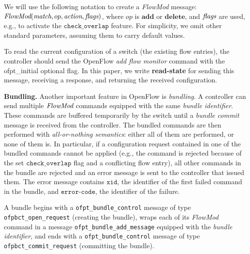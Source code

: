 \documentclass{sig-alternate-2006}
\newcommand{\add}{\textbf{add}\xspace}
\newcommand{\dele}{\textbf{delete}\xspace}
\newcommand{\FlowMod}{\emph{FlowMod}\xspace}
\newcommand{\match}{\emph{match}\xspace}
\newcommand{\action}{\emph{action}\xspace}
\newcommand{\flags}{\emph{flags}\xspace}
\newcommand{\checko}{\texttt{check\_overlap}\xspace}
\newcommand{\stefan}[1]{\textit{\textcolor{red}{[stefan]: #1}}} %
\newcommand{\liron}[1]{\textit{\textcolor{mypurple}{[liron]: #1}}} %
\newcommand{\petr}[1]{\textit{\textcolor{blue}{[petr]: #1}}} %
\newcommand{\xid}{\texttt{xid}}
\newcommand{\ecode}{\texttt{error-code}}
\begin{document}
We will use the following notation to create a \emph{FlowMod} message:
$\FlowMod(\match, op, \action, \flags)$, where
$op$ is $\add$ or $\dele$, and $\flags$ are used, e.g.,  to activate the $\checko$
feature.
For simplicity, we omit other standard parameters, assuming them to carry
default values.

To read the current configuration of a switch (the existing flow entries), the controller should send
the OpenFlow \emph{add flow monitor} command with the \textsf{ofpt\_initial} optional flag.
In this paper, we write \textbf{read-state} for sending
this message, receiving a response, and returning the received configuration.

\vspace{1mm}
\noindent\textbf{Bundling.}
%
Another important feature in OpenFlow is \emph{bundling}. %
A controller can send multiple $\FlowMod$ commands  equipped with
the same \emph{bundle identifier}.
These commands are buffered temporarily by
the switch until a \emph{bundle commit} message is received from the
controller.
The bundled commands are then performed with \emph{all-or-nothing semantics}:
either all of them are performed, or none of them is.
In particular, if a configuration request contained in one of the bundled commands cannot
be applied (e.g., the command is rejected because of the set
$\checko$ flag and a conflicting flow entry), all  other commands in
the bundle are rejected and an error
message is sent to the controller that issued them.
The error message contains $\xid$, the identifier of the first failed command in the
bundle, and $\ecode$, the identifier of the failure.

A bundle begins with a  \texttt{ofpt\_bundle\_control} message of type
\texttt{ofpbct\_open\_request} (creating the bundle), wraps
each of its \emph{FlowMod} command in a message
\texttt{ofpt\_bundle\_add\_message} equipped with the \emph{bundle
  identifier}, and ends with a \texttt{ofpt\_bundle\_control} message of
type \texttt{ofpbct\_commit\_request} (committing the bundle).
\end{document}
